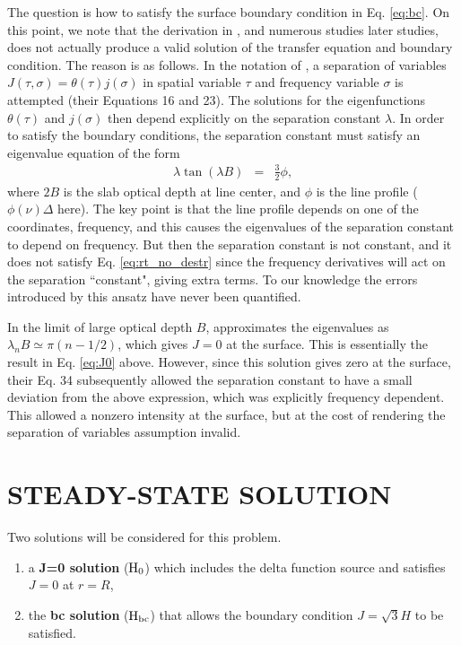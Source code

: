 \documentclass{aastex63}
\newcommand{\be}{\begin{eqnarray}}
\newcommand{\ee}{\end{eqnarray}}
\begin{document}
The question is how to satisfy the surface boundary condition in Eq. \ref{eq:bc}. On this point, we note that the derivation in \citet{1973MNRAS.162...43H}, and numerous studies later studies, does not actually produce a valid solution of the transfer equation and boundary condition. The reason is as follows. In the notation of \citet{1973MNRAS.162...43H}, a separation of variables
$J(\tau,\sigma) = \theta(\tau) j(\sigma)$ in spatial variable $\tau$ and frequency variable $\sigma$ is attempted (their Equations 16 and 23). The solutions for the eigenfunctions $\theta(\tau)$ and $j(\sigma)$ then depend explicitly on the separation constant $\lambda$. In order to satisfy the boundary conditions, the separation constant must satisfy an eigenvalue equation of the form
\be
\lambda \tan(\lambda B) & = & \frac{3}{2} \phi,
\label{eq:evalue}
\ee
where $2B$ is the slab optical depth at line center, and $\phi$ is the line profile ($\phi(\nu)\Delta$ here). The key point is that the line profile depends on one of the coordinates, frequency, and this causes the eigenvalues of the separation constant to depend on frequency. But then the separation constant is not constant, and it does not satisfy Eq. \ref{eq:rt_no_destr} since the frequency derivatives will act on the separation ``constant", giving extra terms. To our knowledge the errors introduced by this ansatz have never been quantified. 

In the limit of large optical depth $B$, \citealt{1973MNRAS.162...43H} approximates the eigenvalues as $\lambda_n B \simeq \pi (n-1/2)$, which gives $J=0$ at the surface. This is essentially the result in Eq. \ref{eq:J0} above. However, since this solution gives zero at the surface, their Eq. 34 subsequently allowed the separation constant to have a small deviation from the above expression, which was explicitly frequency dependent. This allowed a nonzero intensity at the surface, but at the cost of rendering the separation of variables assumption invalid. 

\section{STEADY-STATE SOLUTION}
\label{sec:steadystate}

Two solutions will be considered for this problem.

\begin{enumerate}
    \item a \textbf{J=0 solution} ($\rm H_0$) which includes the delta function source and satisfies $J=0$ at $r=R$,
    \item the \textbf{bc solution} ($\rm H_{bc}$) that allows the boundary condition $J=\sqrt{3}H$ to be satisfied. %
\end{enumerate}
\end{document}
